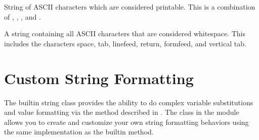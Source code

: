 \documentclass[letterpaper,10pt,english]{sphinxmanual}
\begin{document}

\vspace{5px}

\begin{fulllineitems}
\label{\detokenize{string:string.printable}}
String of ASCII characters which are considered printable.  This is a
combination of {\hyperref[\detokenize{string:string.digits}]{}}, {\hyperref[\detokenize{string:string.ascii_letters}]{}}, {\hyperref[\detokenize{string:string.punctuation}]{}},
and {\hyperref[\detokenize{string:string.whitespace}]{}}.

\end{fulllineitems}


\vspace{5px}

\begin{fulllineitems}
\label{\detokenize{string:string.whitespace}}
A string containing all ASCII characters that are considered whitespace.
This includes the characters space, tab, linefeed, return, formfeed, and
vertical tab.

\end{fulllineitems}



\section{Custom String Formatting}
\label{\detokenize{string:custom-string-formatting}}\label{\detokenize{string:string-formatting}}
The built\sphinxhyphen{}in string class provides the ability to do complex variable
substitutions and value formatting via the  method described in
.  The {\hyperref[\detokenize{string:string.Formatter}]{}} class in the {\hyperref[\detokenize{string:module-string}]{}} module allows
you to create and customize your own string formatting behaviors using the same
implementation as the built\sphinxhyphen{}in  method.
\end{document}
